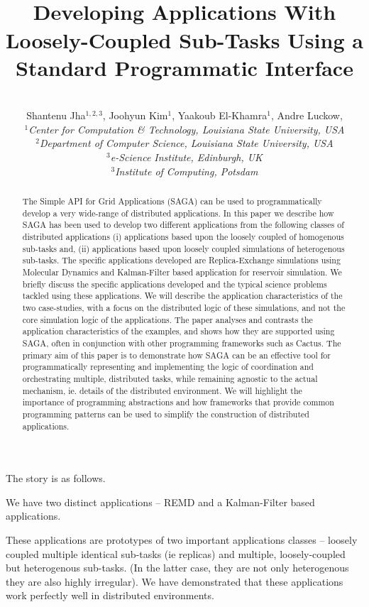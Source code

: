 \documentclass[conference,final]{IEEEtran}
\title{
  ~\\[-3em]
  Developing Applications With Loosely-Coupled Sub-Tasks Using a
  Standard Programmatic Interface}
\author{
    ~\\[-2em]
    Shantenu Jha$^{1,2,3}$, Joohyun Kim$^{1}$,
    Yaakoub El-Khamra$^{1}$, Andre Luckow, \\ 
    \small{\emph{$^{1}$Center for Computation \& Technology, Louisiana State University, USA}}\\
    \small{\emph{$^{2}$Department of Computer Science, Louisiana State
        University, USA}}\\
    \small{\emph{$^{3}$e-Science Institute, Edinburgh, UK}}\\
    \small{\emph{$^{3}$Institute of Computing, Potsdam}}\\

  }
\begin{document}
 


\maketitle    

\begin{abstract}
  The Simple API for Grid Applications (SAGA) can be used to
  programmatically develop a very wide-range of distributed
  applications.  In this paper we describe how SAGA has been used to
  develop two different applications from the following classes of
  distributed applications (i) applications based upon the loosely
  coupled of homogenous sub-tasks and, (ii) applications based upon
  loosely coupled simulations of heterogenous sub-tasks. The specific
  applications developed are Replica-Exchange simulations using
  Molecular Dynamics and Kalman-Filter based application for reservoir
  simulation.  We briefly discuss the specific applications developed
  and the typical science problems tackled using these applications.
  We will describe the application characteristics of the two
  case-studies, with a focus on the distributed logic of these
  simulations, and not the core simulation logic of the applications.
  The paper analyses and contrasts the application characteristics of
  the examples, and shows how they are supported using SAGA, often in
  conjunction with other programming frameworks such as Cactus.  The
  primary aim of this paper is to demonstrate how SAGA can be an
  effective tool for programmatically representing and implementing the
  logic of coordination and orchestrating multiple, distributed tasks,
  while remaining agnostic to the actual mechanism, ie. details of the
  distributed environment. We will highlight the importance of
  programming abstractions and how frameworks that provide common
  programming patterns can be used to simplify the construction of
  distributed applications.
\end{abstract}


The story is as follows. 

We have two distinct applications -- REMD and a Kalman-Filter based
applications.

These applications are prototypes of two important applications
classes -- loosely coupled multiple identical sub-tasks (ie replicas)
and multiple, loosely-coupled but heterogenous sub-tasks.  (In the
latter case, they are not only heterogenous they are also highly
irregular).  We have demonstrated that these applications work
perfectly well in distributed environments.
\end{document}
